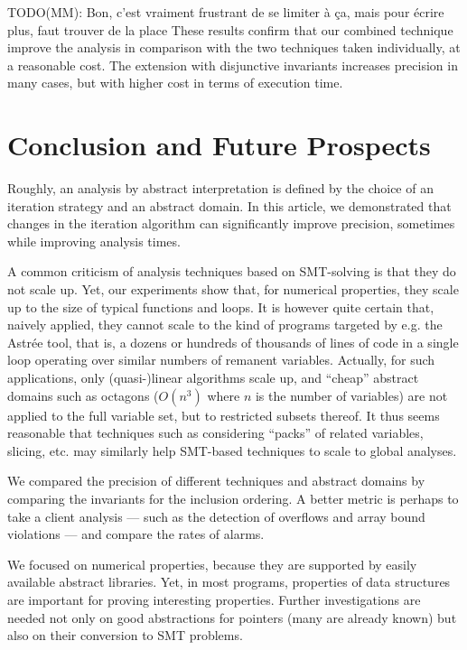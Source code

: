 \documentclass{llncs}
\newcommand{\MM}[1]{{\color{blue} TODO(MM): #1}}
\newcommand{\MM}[1]{}
\begin{document}
\MM{Bon, c'est vraiment frustrant de se limiter à ça, mais pour écrire
  plus, faut trouver de la place}
These results confirm that our combined technique improve the
analysis in comparison with the two techniques taken individually, at
a reasonable cost. The extension with disjunctive invariants increases
precision in many cases, but with higher cost in terms of execution
time.

\section{Conclusion and Future Prospects}
Roughly, an analysis by abstract interpretation is defined by the choice of an iteration strategy and an abstract domain. In this article, we demonstrated that changes in the iteration algorithm can significantly improve precision, sometimes while improving analysis times.

A common criticism of analysis techniques based on SMT-solving is that they
do not scale up. Yet, our experiments show that, for numerical properties,
they scale up to the size of typical functions and loops.
It is however
quite certain that, naively applied, they cannot scale to the kind of
programs targeted by e.g. the Astr\'ee tool, that is, a dozens or hundreds
of thousands of lines of code in a single loop operating over similar numbers
of remanent variables.
Actually, for such applications, only (quasi-)linear
algorithms scale up, and ``cheap'' abstract domains such as octagons ($O(n^3)$ where $n$ is the number of variables) are not applied to the full variable set, but to restricted subsets thereof.
It thus seems reasonable that techniques such as considering ``packs'' of related variables, slicing, etc. may similarly help SMT-based techniques to scale to global analyses.

We compared the precision of different techniques and abstract domains by comparing the invariants for the inclusion ordering. A better metric is perhaps to take a client analysis --- such as the detection of overflows and array bound violations --- and compare the rates of alarms.

We focused on numerical properties, because they are supported by easily available abstract libraries. Yet, in most programs, properties of data structures are important for proving interesting properties. Further investigations are needed not only on good abstractions for pointers (many are already known) but also on their conversion to SMT problems.

\FloatBarrier
\end{document}
